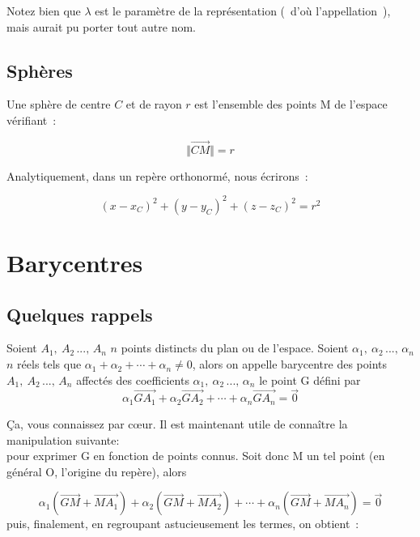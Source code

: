 \documentclass[french]{book}
\newcommand{\ve}[1]{\overrightarrow{#1}}
\newcommand{\pa}[1]{(#1)}
\newcommand{\al}{\alpha}
\newcommand{\la}{\lambda}
\begin{document}
Notez  bien que  $\la$  est  le paramètre  de  la représentation  (~d'où
l'appellation~), mais aurait pu porter tout autre nom. 







\subsection{Sphères}


\begin{defn}[Sphère]
  
Une sphère de centre $C$ et de  rayon $r$ est l'ensemble des points M de
l'espace vérifiant~:

$$\Vert \ve{CM} \Vert =r$$
\end{defn}



Analytiquement, dans un repère orthonormé, nous écrirons~:


$$(x-x_C)^2+(y-y_C)^2+(z-z_C)^2=r^2$$





\section{Barycentres}

\subsection{Quelques rappels}




\begin{defn}[Barycentre]
  Soient $A_1,\ A_2\,...,\,A_n$ $n$ points distincts du plan ou de l'espace. Soient $\al_1,\ \al_2\,...,\,\al_n$ $n$ réels tels que $\al_1+\al_2+\cdots+\al_n\neq 0$, alors on appelle barycentre des points $A_1,\ A_2\,...,\,A_n$ affectés des coefficients $\al_1,\ \al_2\,...,\,\al_n$ le point G défini par 
$$\al_1\ve{GA_1}+\al_2\ve{GA_2}+\cdots+\al_n\ve{GA_n}=\ve{0}$$
\end{defn}


\c Ca, vous connaissez par c\oe ur. Il est maintenant utile de connaître la manipulation suivante:\\
 pour exprimer G en fonction de points connus. Soit donc M un tel point (en général O, l'origine du repère), alors

$$\al_1\pa{\ve{GM}+\ve{MA_1}}+\al_2\pa{\ve{GM}+\ve{MA_2}}+\cdots+\al_n\pa{\ve{GM}+\ve{MA_n}}=\ve{0}$$
 puis, finalement, en regroupant astucieusement les termes, on obtient~:
\end{document}
